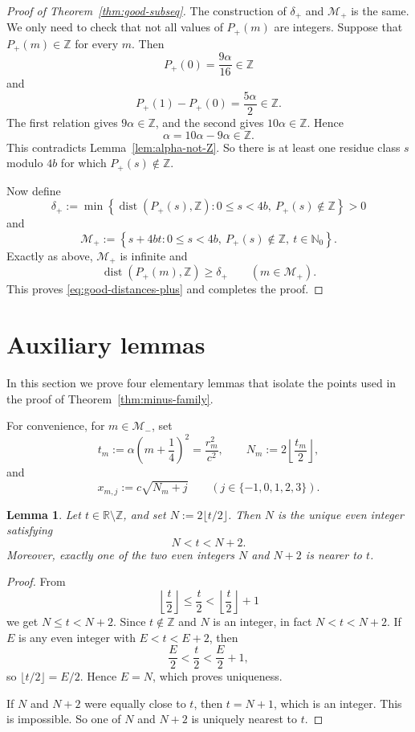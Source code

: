 \documentclass[reqno]{amsart}
\theoremstyle{definition}
\theoremstyle{plain}
\newtheorem{lemma}      {Lemma}
\theoremstyle{remark}
\numberwithin{equation}{section}
\newcommand{\Z}{\mathbb{Z}}
\newcommand{\N}{\mathbb{N}}
\newcommand{\R}{\mathbb{R}}
\newcommand{\dist}{\operatorname{dist}}
\begin{document}
\begin{proof}[Proof of Theorem~\ref{thm:good-subseq}]
The construction of $\delta_+$ and $\mathcal M_+$ is the same. We only need to check that not all values of $P_+(m)$ are integers. Suppose that $P_+(m)\in \Z$ for every $m$. Then
\[
  P_+(0)=\frac{9\alpha}{16}\in \Z
\]
and
\[
  P_+(1)-P_+(0)=\frac{5\alpha}{2}\in \Z.
\]
The first relation gives $9\alpha\in \Z$, and the second gives $10\alpha\in \Z$. Hence
\[
  \alpha=10\alpha-9\alpha\in \Z.
\]
This contradicts Lemma~\ref{lem:alpha-not-Z}. So there is at least one residue class $s$ modulo $4b$ for which $P_+(s)\notin \Z$.

Now define
\[
  \delta_+:=\min\left\{\dist(P_+(s),\Z):0\le s<4b,\ P_+(s)\notin \Z\right\}>0
\]
and
\[
  \mathcal M_+:=\left\{s+4bt:0\le s<4b,\ P_+(s)\notin \Z,\ t\in \N_0\right\}.
\]
Exactly as above, $\mathcal M_+$ is infinite and
\[
  \dist(P_+(m),\Z)\ge \delta_+
  \qquad (m\in \mathcal M_+).
\]
This proves \eqref{eq:good-distances-plus} and completes the proof.
\end{proof}

\section{Auxiliary lemmas}\label{sec:lemmas}

In this section we prove four elementary lemmas that isolate the points used in the proof of Theorem~\ref{thm:minus-family}.

For convenience, for $m\in \mathcal M_-$, set
\[
  t_m:=\alpha\left(m+\frac14\right)^2=\frac{r_m^2}{c^2},
  \qquad
  N_m:=2\left\lfloor \frac{t_m}{2}\right\rfloor,
\]
and
\[
  x_{m,j}:=c\sqrt{N_m+j}
  \qquad (j\in\{-1,0,1,2,3\}).
\]

\begin{lemma}\label{lem:surround-even}
Let $t\in \R\setminus\Z$, and set $N:=2\lfloor t/2\rfloor$. Then $N$ is the unique even integer satisfying
\[
  N<t<N+2.
\]
Moreover, exactly one of the two even integers $N$ and $N+2$ is nearer to $t$.
\end{lemma}

\begin{proof}
From
\[
  \left\lfloor \frac{t}{2}\right\rfloor\le \frac{t}{2}<\left\lfloor \frac{t}{2}\right\rfloor+1
\]
we get $N\le t<N+2$. Since $t\notin\Z$ and $N$ is an integer, in fact $N<t<N+2$. If $E$ is any even integer with $E<t<E+2$, then
\[
  \frac{E}{2}<\frac{t}{2}<\frac{E}{2}+1,
\]
so $\lfloor t/2\rfloor=E/2$. Hence $E=N$, which proves uniqueness.

If $N$ and $N+2$ were equally close to $t$, then $t=N+1$, which is an integer. This is impossible. So one of $N$ and $N+2$ is uniquely nearest to $t$.
\end{proof}
\end{document}

